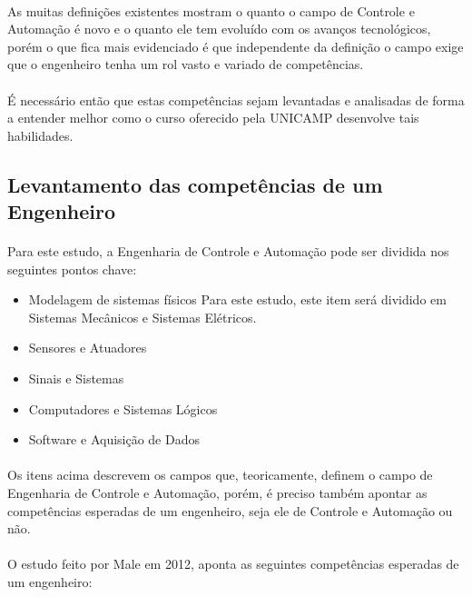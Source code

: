 \documentclass[12pt]{article} %
\begin{document}
\paragraph{}As muitas definições existentes mostram o quanto o campo de Controle e Automação é novo e o quanto ele tem evoluído com os avanços tecnológicos, porém o que fica mais evidenciado é que independente da definição o campo exige que o engenheiro tenha um rol vasto e variado de competências.

\paragraph{}É necessário então que estas competências sejam levantadas e analisadas de forma a entender melhor como o curso oferecido pela UNICAMP desenvolve tais habilidades.


\subsection{Levantamento das competências de um Engenheiro}
\paragraph{}Para este estudo, a Engenharia de Controle e Automação pode ser dividida nos seguintes pontos chave:

\begin{itemize}
\setlength\itemsep{0.01mm}
\item Modelagem de sistemas físicos
	\subitem Para este estudo, este item será dividido em Sistemas Mecânicos e Sistemas Elétricos.
\item Sensores e Atuadores
\item Sinais e Sistemas
\item Computadores e Sistemas Lógicos
\item Software e Aquisição de Dados
\end{itemize}

\paragraph{}Os itens acima descrevem os campos que, teoricamente, definem o campo de Engenharia de Controle e Automação, porém, é preciso também apontar as competências esperadas de um engenheiro, seja ele de Controle e Automação ou não.

\paragraph{}O estudo feito por Male em 2012, aponta as seguintes competências esperadas de um engenheiro:
\end{document}
